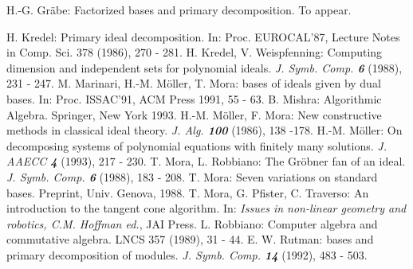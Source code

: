 \begin{thebibliography}{xxx}
 H.-G. Gr\"abe: Factorized \gr bases and primary
decomposition. To appear.

 H. Kredel: Primary ideal decomposition. In: Proc.
EUROCAL'87, Lecture Notes in Comp. Sci. 378 (1986), 270 - 281.
 H. Kredel, V. Weispfenning: Computing dimension and
independent sets for polynomial ideals. {\it J. Symb. Comp. \bf 6}
(1988), 231 - 247.
 M. Marinari, H.-M. M\"oller, T. Mora: \gr bases of
ideals given by dual bases. In: Proc. ISSAC'91, ACM Press 1991, 55 -
63.
 B. Mishra: Algorithmic Algebra. Springer, New York
1993.
 H.-M. M\"oller, F. Mora: New constructive methods in
classical ideal theory. {\it J. Alg. \bf 100} (1986), 138 -178.
 H.-M. M\"oller: On decomposing systems of polynomial
equations with finitely many solutions. {\em J. AAECC \bf 4} (1993),
217 - 230.
 T. Mora, L. Robbiano: The Gr\"obner fan of an ideal.
{\it J. Symb. Comp. \bf 6} (1988), 183 - 208.
 T. Mora: Seven variations on standard bases.
Preprint, Univ. Genova, 1988.
 T. Mora, G. Pfister, C. Traverso: An introduction to
the tangent cone algorithm. In: {\em Issues in non-linear geometry and
robotics, C.M. Hoffman ed.}, JAI Press.
 L. Robbiano: Computer algebra and commutative algebra.
LNCS 357 (1989), 31 - 44.
 E. W. Rutman: \gr bases and primary decomposition of
modules. {\it J. Symb. Comp. \bf 14} (1992), 483 - 503.

\end{thebibliography}



